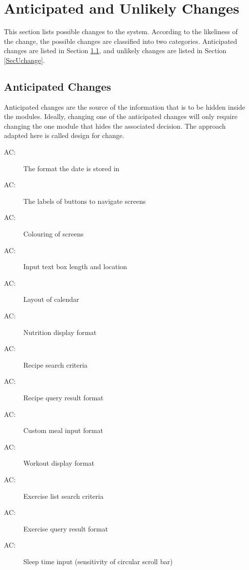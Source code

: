 \documentclass[12pt, titlepage]{article}
\newcounter{acnum}
\newcommand{\actheacnum}{AC\theacnum}
\begin{document}
\section{Anticipated and Unlikely Changes} \label{SecChange}

This section lists possible changes to the system. According to the likeliness
of the change, the possible changes are classified into two
categories. Anticipated changes are listed in Section \ref{SecAchange}, and
unlikely changes are listed in Section \ref{SecUchange}.

\subsection{Anticipated Changes} \label{SecAchange}

Anticipated changes are the source of the information that is to be hidden
inside the modules. Ideally, changing one of the anticipated changes will only
require changing the one module that hides the associated decision. The approach
adapted here is called design for
change.

\begin{description}
	\item[ \actheacnum \label{acHardware}:] The format the date is stored in
	\item[ \actheacnum \label{acInput}:] The labels of buttons to navigate screens
	\item[ \actheacnum \label{acInput}:] Colouring of screens
	\item[ \actheacnum \label{acInput}:] Input text box length and location
	\item[ \actheacnum \label{acInput}:] Layout of calendar
	\item[ \actheacnum \label{acInput}:] Nutrition display format
	\item[ \actheacnum \label{acInput}:] Recipe search criteria
	\item[ \actheacnum \label{acInput}:] Recipe query result format
	\item[ \actheacnum \label{acInput}:] Custom meal input format
	\item[ \actheacnum \label{acInput}:] Workout display format
	\item[ \actheacnum \label{acInput}:] Exercise list search criteria
	\item[ \actheacnum \label{acInput}:] Exercise query result format
	\item[ \actheacnum \label{acInput}:] Sleep time input (sensitivity of circular scroll bar)
\end{description}
\end{document}
